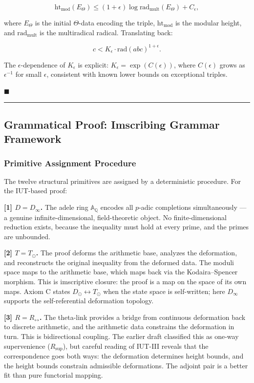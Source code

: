 \documentclass[12pt,a4paper]{article}
\begin{document}
\[\text{ht}_{\text{mod}}(E_{\Theta}) \leq (1 + \epsilon) \log \text{rad}_{\text{mult}}(E_{\Theta}) + C_{\epsilon},\]

where $E_{\Theta}$ is the initial $\Theta$-data encoding the triple, $\text{ht}_{\text{mod}}$ is the modular height, and $\text{rad}_{\text{mult}}$ is the multiradical radical. Translating back:

\[c < K_{\epsilon} \cdot \text{rad}(abc)^{1+\epsilon}.\]

The $\epsilon$-dependence of $K_{\epsilon}$ is explicit: $K_{\epsilon} = \exp(C(\epsilon))$, where $C(\epsilon)$ grows as $\epsilon^{-1}$ for small $\epsilon$, consistent with known lower bounds on exceptional triples.

$\blacksquare$

\begin{center}
\rule{0.5\textwidth}{0.4pt}
\end{center}

\subsection{Grammatical Proof: Imscribing Grammar Framework}

\subsubsection{Primitive Assignment Procedure}

The twelve structural primitives are assigned by a deterministic procedure. For the IUT-based proof:

\textbf{{[}1{]} $D = D_{\infty}$.} The adele ring $\mathbb{A}_\mathbb{Q}$ encodes all $p$-adic completions simultaneously --- a genuine infinite-dimensional, field-theoretic object. No finite-dimensional reduction exists, because the inequality must hold at every prime, and the primes are unbounded.

\textbf{{[}2{]} $T = T_{\odot}$.} The proof deforms the arithmetic base, analyzes the deformation, and reconstructs the original inequality from the deformed data. The moduli space maps to the arithmetic base, which maps back via the Kodaira--Spencer morphism. This is imscriptive closure: the proof is a map on the space of its own maps. Axiom C states $D_{\odot} \leftrightarrow T_{\odot}$ when the state space is self-written; here $D_{\infty}$ supports the self-referential deformation topology.

\textbf{{[}3{]} $R = R_{\leftrightarrow}$.} The theta-link provides a bridge from continuous deformation back to discrete arithmetic, and the arithmetic data constrains the deformation in turn. This is bidirectional coupling. The earlier draft classified this as one-way supervenience ($R_\text{sup}$), but careful reading of IUT-III reveals that the correspondence goes both ways: the deformation determines height bounds, and the height bounds constrain admissible deformations. The adjoint pair is a better fit than pure functorial mapping.
\end{document}
